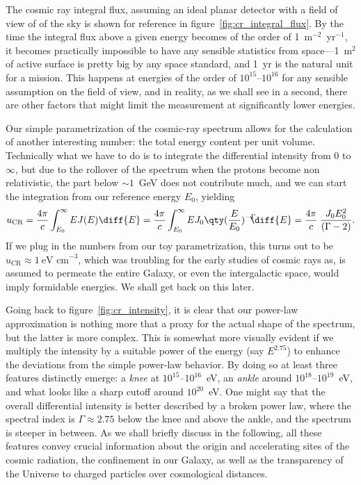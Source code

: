 The cosmic ray integral flux, assuming an ideal planar detector with a field of
view of  of the sky is shown for reference in figure~\ref{fig:cr_integral_flux}.
By the time the integral flux above a given energy becomes of the order
of 1~m$^{-2}$~yr$^{-1}$, it becomes practically impossible to have any sensible
statistics from space---1~m$^2$ of active surface is pretty big by any space standard,
and 1~yr is the natural unit for a mission. This happens at energies of the order
of $10^{15}$--$10^{16}$ for any sensible assumption on the field of view, and in
reality, as we shall see in a second, there are other factors that might limit
the measurement at significantly lower energies.

Our simple parametrization of the cosmic-ray spectrum allows for the calculation
of another interesting number: the total energy content per unit volume.
Technically what we have to do is to integrate the differential intensity from
$0$ to $\infty$, but due to the rollover of the spectrum when the protons become
non relativistic, the part below $\sim 1$~GeV does not contribute much,
and we can start the integration from our reference energy $E_0$, yielding
\begin{align}
  u_\text{CR} = \frac{4\pi}{c} \int_{E_0}^\infty E J(E)  \diff{E} =
  \frac{4\pi}{c} \int_{E_0}^\infty E J_0 \qty(\frac{E}{E_0})^{-\Gamma} \!\!\!\! \diff{E} =
  \frac{4\pi}{c} \; \frac{J_0 E_0^2}{(\Gamma - 2)}.
\end{align}
If we plug in the numbers from our toy parametrization, this turns out to be
$u_\text{CR} \approx 1~\text{eV~cm}^{-3}$, which was troubling for the early studies
of cosmic rays as, is assumed to permeate the entire Galaxy, or even the
intergalactic space, would imply formidable energies. We shall get back on this
later.

Going back to figure~\ref{fig:cr_intensity}, it is clear that our power-law
approximation is nothing more that a proxy for the actual shape of the spectrum,
but the latter is more complex. This is somewhat more visually evident if we
multiply the intensity by a suitable power of the energy (say $E^{2.75}$) to
enhance the deviations from the simple power-law behavior. By doing so at least
three features distinctly emerge: a \emph{knee} at $10^{15}$--$10^{16}$~eV,
an \emph{ankle} around $10^{18}$--$10^{19}$~eV, and what looks like a sharp cutoff
around $10^{20}$~eV. One might say that the overall differential intensity is
better described by a broken power law, where the spectral index is $\Gamma \approx 2.75$
below the knee and above the ankle, and the spectrum is steeper in between.
As we shall briefly discuss in the following, all these features convey crucial
information about the origin and accelerating sites of the cosmic radiation, the
confinement in our Galaxy, as well as the transparency of the Universe to charged
particles over cosmological distances.

